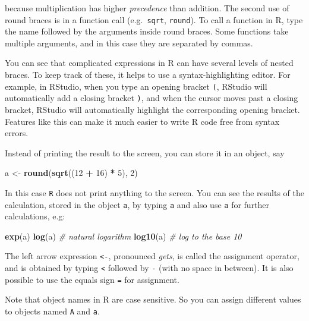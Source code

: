 \documentclass[
]{book}
\newenvironment{Shaded}{\begin{snugshade}}{\end{snugshade}}
\newcommand{\CommentTok}[1]{\textcolor[rgb]{0.56,0.35,0.01}{\textit{#1}}}
\newcommand{\DecValTok}[1]{\textcolor[rgb]{0.00,0.00,0.81}{#1}}
\newcommand{\FunctionTok}[1]{\textcolor[rgb]{0.13,0.29,0.53}{\textbf{#1}}}
\newcommand{\NormalTok}[1]{#1}
\newcommand{\OtherTok}[1]{\textcolor[rgb]{0.56,0.35,0.01}{#1}}
\newcommand{\SpecialCharTok}[1]{\textcolor[rgb]{0.81,0.36,0.00}{\textbf{#1}}}
\begin{document}
because multiplication has higher \emph{precedence} than addition. The
second use of round braces is in a function call (e.g.~\texttt{sqrt},
\texttt{round}). To call a function in R, type the name followed by the
arguments inside round braces. Some functions take multiple arguments,
and in this case they are separated by commas.

You can see that complicated expressions in R can have several levels
of nested braces. To keep track of these, it helps to use a
syntax-highlighting editor. For example, in RStudio, when you type an
opening bracket \texttt{(}, RStudio will automatically add a closing
bracket \texttt{)}, and when the cursor moves past a closing bracket,
RStudio will automatically highlight the corresponding opening
bracket. Features like this can make it much easier to write R code
free from syntax errors.

Instead of printing the result to the screen, you can store it in an object, say

\begin{Shaded}
\begin{Highlighting}[]
\NormalTok{a }\OtherTok{\textless{}{-}} \FunctionTok{round}\NormalTok{(}\FunctionTok{sqrt}\NormalTok{((}\DecValTok{12} \SpecialCharTok{+} \DecValTok{16}\NormalTok{) }\SpecialCharTok{*} \DecValTok{5}\NormalTok{), }\DecValTok{2}\NormalTok{)}
\end{Highlighting}
\end{Shaded}

In this case \texttt{R} does not print anything to the screen. You can
see the results of the calculation, stored in the object \texttt{a},
by typing \texttt{a} and also use \texttt{a} for further calculations,
e.g:

\begin{Shaded}
\begin{Highlighting}[]
\FunctionTok{exp}\NormalTok{(a)}
\FunctionTok{log}\NormalTok{(a) }\CommentTok{\# natural logarithm}
\FunctionTok{log10}\NormalTok{(a) }\CommentTok{\# log to the base 10}
\end{Highlighting}
\end{Shaded}

The left arrow expression \texttt{\textless{}-}, pronounced \emph{gets}, is called
the assignment operator, and is obtained by typing \texttt{\textless{}} followed
by \texttt{-} (with no space in between). It is also possible to use
the equals sign \texttt{=} for assignment.

Note that object names in R are case sensitive. So you can assign
different values to objects named \texttt{A} and \texttt{a}.
\end{document}
